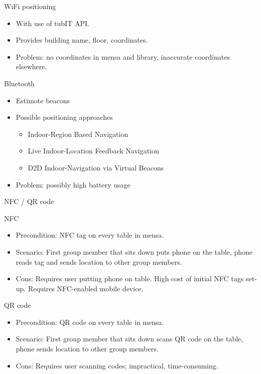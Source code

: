 \documentclass[9pt]{beamer}
\begin{document}
\begin{frame}{WiFi positioning}

	\begin{itemize}
	
		\item With use of tubIT API.
		\item Provides building name, floor, coordinates.
		\item Problem: no coordinates in mensa and library, inaccurate coordinates elsewhere.

	\end{itemize}
	
\end{frame}

\begin{frame}{Bluetooth \cite{feldmann2003indoor}}

	\begin{itemize}
	
		\item Estimote beacons
		\item Possible positioning approaches
			\begin{itemize}
				\item Indoor-Region Based Navigation
				\item Live Indoor-Location Feedback Navigation
				\item D2D Indoor-Navigation via Virtual Beacons
			\end{itemize}
		\item Problem: possibly high battery usage

	\end{itemize}

\end{frame}

\begin{frame}{NFC / QR code}

	NFC
	\begin{itemize}
	
		\item Precondition: NFC tag on every table in mensa.
		\item Scenario: First group member that sits down puts phone on the table, phone reads tag and sends location to other group members.
		\item Cons: Requires user putting phone on table. High cost of initial NFC tags set-up. Requires NFC-enabled mobile device.

	\end{itemize}
	
	\bigskip
	QR code
	\begin{itemize}
	
		\item Precondition: QR code on every table in mensa.
		\item Scenario: First group member that sits down scans QR code on the table, phone sends location to other group members.
		\item Cons: Requires user scanning codes; impractical, time-consuming. 

	\end{itemize}

\end{frame}
\end{document}
